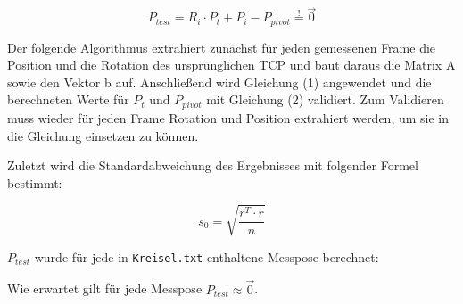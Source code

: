 \documentclass[11pt, a4paper]{article}
\newcommand{\code}{\texttt}
\begin{document}
\begin{equation}
P_{test} = R_i \cdot P_t + P_i - P_{pivot} \overset{!}{=} \vec{0}
\end{equation}

Der folgende Algorithmus extrahiert zunächst für jeden gemessenen Frame die Position und die Rotation des ursprünglichen TCP und baut daraus die Matrix A sowie den Vektor b auf. Anschließend wird Gleichung (1) angewendet und die berechneten Werte für $P_t$ und $P_{pivot}$ mit Gleichung (2) validiert. Zum Validieren muss wieder für jeden Frame Rotation und Position extrahiert werden, um sie in die Gleichung einsetzen zu können.

Zuletzt wird die Standardabweichung des Ergebnisses mit folgender Formel bestimmt:

\begin{equation*}
s_0=\sqrt{\frac{r^T \cdot r}{n}}
\end{equation*}



$P_{test}$ wurde für jede in \code{Kreisel.txt} enthaltene Messpose berechnet:





Wie erwartet gilt für jede Messpose $P_{test} \approx \vec{0}$.
\end{document}
